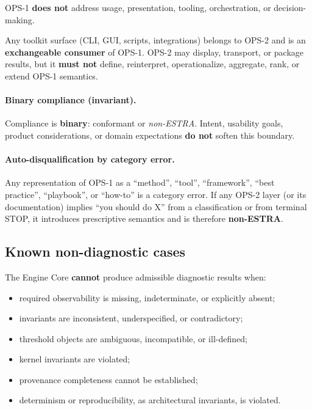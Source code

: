 OPS-1 \textbf{does not} address usage,
presentation, tooling,
orchestration, or decision-making.

Any toolkit surface (CLI, GUI, scripts, integrations)
belongs to OPS-2 and is an
\textbf{exchangeable consumer} of OPS-1.
OPS-2 may display, transport,
or package results,
but it \textbf{must not} define,
reinterpret, operationalize,
aggregate, rank, or extend OPS-1 semantics.

\paragraph{Binary compliance (invariant).}
Compliance is \textbf{binary}:
conformant or \emph{non-ESTRA}.
Intent, usability goals,
product considerations,
or domain expectations
\textbf{do not} soften this boundary.

\paragraph{Auto-disqualification by category error.}
Any representation of OPS-1 as a
``method'', ``tool'',
``framework'', ``best practice'',
``playbook'', or ``how-to''
is a category error.
If any OPS-2 layer
(or its documentation)
implies ``you should do X''
from a classification
or from terminal STOP,
it introduces prescriptive semantics
and is therefore \textbf{non-ESTRA}.

\subsection{Known non-diagnostic cases}

The Engine Core \textbf{cannot}
produce admissible diagnostic results
when:
\begin{itemize}
  \item required observability is missing,
        indeterminate,
        or explicitly absent;
  \item invariants are inconsistent,
        underspecified,
        or contradictory;
  \item threshold objects are ambiguous,
        incompatible,
        or ill-defined;
  \item kernel invariants are violated;
  \item provenance completeness
        cannot be established;
  \item determinism or reproducibility,
        as architectural invariants,
        is violated.
\end{itemize}

